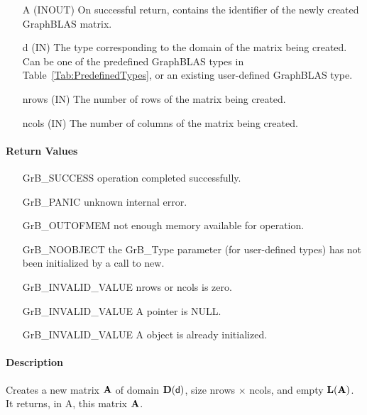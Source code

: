 \begin{itemize}[leftmargin=1.1in]
    \item[{\sf A}] ({\sf INOUT}) On successful return, contains the identifier of 
                                 the newly created GraphBLAS matrix.
    \item[{\sf d}] ({\sf IN})    The type corresponding to the domain of the matrix 
                                 being created. Can be one of the predefined
                                 GraphBLAS types in Table~\ref{Tab:PredefinedTypes}, 
                                 or an existing user-defined GraphBLAS type.
    \item[{\sf nrows}] ({\sf IN}) The number of rows of the matrix being created.
    \item[{\sf ncols}] ({\sf IN}) The number of columns of the matrix being created.
\end{itemize}


\paragraph{Return Values}

\begin{itemize}[leftmargin=2.1in]
\item[{\sf GrB\_SUCCESS}]   operation completed successfully.
\item[{\sf GrB\_PANIC}]     unknown internal error.
\item[{\sf GrB\_OUTOFMEM}]  not enough memory available for operation.
\item[{\sf GrB\_NOOBJECT}]   the {\sf GrB\_Type} parameter (for user-defined
                             types) has not been initialized by a
                             call to {\sf new}.
\item[{\sf GrB\_INVALID\_VALUE}]    {\sf nrows} or {\sf ncols} is zero.
\item[{\sf GrB\_INVALID\_VALUE}]    {\sf A} pointer is {\sf NULL}.
\item[{\sf GrB\_INVALID\_VALUE}]    {\sf A} object is already initialized.
\end{itemize}

\paragraph{Description}

Creates a new matrix ${\bf A}$ of domain $\bold{D}({\sf d})$, size {\sf nrows $\times$ ncols}, and
empty $\bold{L}({\bf A})$. It returns, in {\sf A}, this matrix ${\bf A}$.

